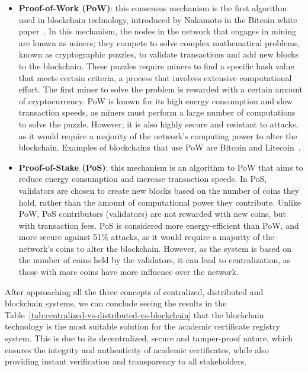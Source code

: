\begin{itemize}
    \item \textbf{Proof-of-Work (PoW)}: this consensus mechanism is the first algorithm used in blockchain technology, introduced by Nakamoto in the Bitcoin white paper~\cite{nakamoto2008bitcoin}.
          In this mechanism, the nodes in the network that engages in mining are known as miners; they compete to solve complex mathematical problems, known as cryptographic puzzles, to validate transactions and add new blocks to the blockchain. These puzzles require miners to find a specific hash value that meets certain criteria, a process that involves extensive computational effort. The first miner to solve the problem is rewarded with a certain amount of cryptocurrency.
          PoW is known for its high energy consumption and slow transaction speeds, as miners must perform a large number of computations to solve the puzzle. However, it is also highly secure and resistant to attacks, as it would require a majority of the network's computing power to alter the blockchain.
          Examples of blockchains that use PoW are Bitcoin and Litecoin~\cite{takashima2018litecoin}.
    \item \textbf{Proof-of-Stake (PoS)}: this mechanism is an algorithm to PoW that aims to reduce energy consumption and increase transaction speeds.
          In PoS, validators are chosen to create new blocks based on the number of coins they hold, rather than the amount of computational power they contribute.
          Unlike PoW, PoS contributors (validators) are not rewarded with new coins, but with transaction fees. PoS is considered more energy-efficient than PoW, and more secure
          against 51\% attacks, as it would require a majority of the network's coins to alter the blockchain. However, as the system is based on the number of coins held by the validators, it can lead to centralization, as those with more coins have more influence over the network.
\end{itemize}

After approaching all the three concepts of centralized, distributed and blockchain systems, we can conclude seeing the results in the Table~\ref{tab:centralized-vs-distributed-vs-blockchain} that the blockchain technology is the most suitable solution for the academic certificate registry system.
This is due to its decentralized, secure and tamper-proof nature, which ensures the integrity and authenticity of academic certificates, while also providing instant verification and transparency to all stakeholders.


